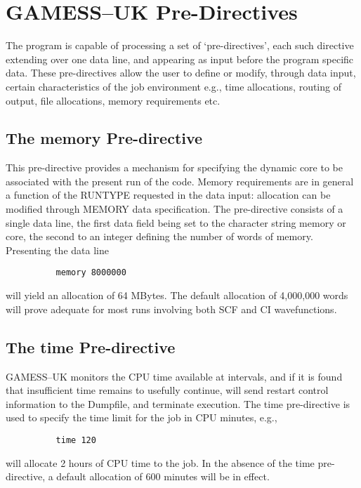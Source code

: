 \documentclass[11pt,fleqn]{article}
\begin{document}
\section[GAMESS--UK Pre-Directives]{GAMESS--UK Pre-Directives}

The program is capable of processing a set of `pre-directives', each
such directive extending over one data line, and appearing as input
before the program specific data. These pre-directives allow the user
to define or modify, through data input, certain characteristics of
the job environment e.g., time allocations, routing of output, file
allocations, memory requirements etc.

\subsection{The memory Pre-directive}
This pre-directive provides a mechanism for specifying the
dynamic core to be associated with the present run of the code.
Memory requirements are in general a function of the
RUNTYPE requested in the data input:  allocation can be 
modified through MEMORY data specification. The pre-directive
consists of a single data line, the first data field
being set to the character string memory or core, the second
to an integer defining the number of words of memory.
Presenting the data line

{
\footnotesize
\begin{verbatim}
          memory 8000000
\end{verbatim}
}
will yield an allocation of 64 MBytes. The default allocation of
4,000,000 words will prove adequate for most runs
involving both SCF and CI wavefunctions.

\subsection{The time Pre-directive}
GAMESS--UK monitors the CPU time available
at intervals, and if it is found that insufficient time remains to
usefully continue, will send restart control information
to the Dumpfile, and terminate execution. The time pre-directive is
used to specify the time limit for the job in CPU minutes, e.g.,

{
\footnotesize
\begin{verbatim}
          time 120
\end{verbatim}
}
will allocate 2 hours of CPU time to the job. In the absence
of the time pre-directive, a default allocation of 600 minutes
will be in effect.
\end{document}
